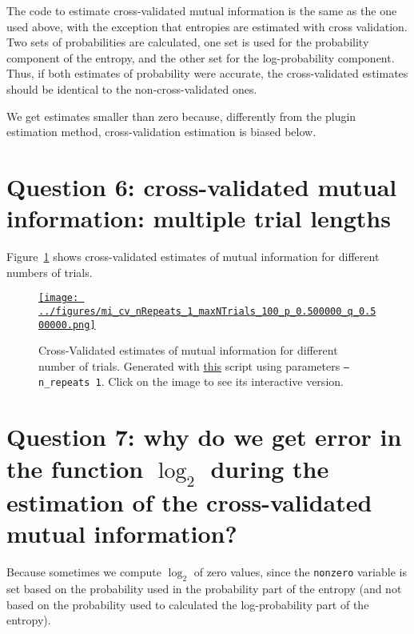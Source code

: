 \documentclass[12pt]{article}
\begin{document}
The code to estimate cross-validated mutual information is the same as the one
used above, with the exception that entropies are estimated with cross
validation. Two sets of probabilities are calculated, one set is used for the
probability component of the entropy, and the other set for the log-probability
component. Thus, if both estimates of probability were accurate, the
cross-validated estimates should be identical to the non-cross-validated ones.

We get estimates smaller than zero because, differently from the plugin
estimation method, cross-validation estimation is biased below.

\section*{Question 6: cross-validated mutual information: multiple trial lengths}

Figure~\ref{fig:miEstimatesCVMultiTrial} shows cross-validated estimates of mutual
information for different numbers of trials.

\begin{figure}[H]
    \begin{center}
        \href{https://www.gatsby.ucl.ac.uk/~rapela/neuroinformatics/2023/ws8/figures/mi_cv_nRepeats_1_maxNTrials_100_p_0.500000_q_0.500000.html}{\texttt{[image: ../figures/mi\_cv\_nRepeats\_1\_maxNTrials\_100\_p\_0.500000\_q\_0.500000.png]}}

        \caption{Cross-Validated estimates of mutual information for different number of trials.
        Generated with
        \href{https://github.com/joacorapela/neuroinformatics23/blob/master/worksheets/ws8/mySolution/code/scripts/doEstimateMI_cv_multiTrials.py}{this}
        script using parameters \texttt{--n\_repeats 1}. Click on the image to see its
        interactive version.}

        \label{fig:miEstimatesCVMultiTrial}
    \end{center}
\end{figure}

\section*{Question 7: why do we get error in the function $\log_2$ during the estimation of the cross-validated mutual information?}

Because sometimes we compute $\log_2$ of zero values, since the
\texttt{nonzero} variable is set based on the probability used in the
probability part of the entropy (and not based on the probability used to
calculated the log-probability part of the entropy).
\end{document}
